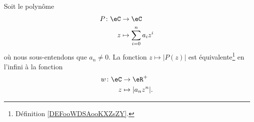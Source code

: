 \begin{proposition}  \label{PROPooPWVWooGuftxZ}
	Soit le polynôme
	\begin{equation}
		\begin{aligned}
			P\colon \eC & \to \eC                           \\
			z           & \mapsto \sum_{i=0}^n a_iz^i
		\end{aligned}
	\end{equation}
	où nous sous-entendons que \( a_n\neq 0\). La fonction \( z\mapsto | P(z) |\) est équivalente\footnote{Définition \ref{DEFooWDSAooKXZsZY}.} en l'infini à la fonction
	\begin{equation}
		\begin{aligned}
			w\colon \eC & \to \eR^+           \\
			z           & \mapsto | a_nz^n |.
		\end{aligned}
	\end{equation}
\end{proposition}

